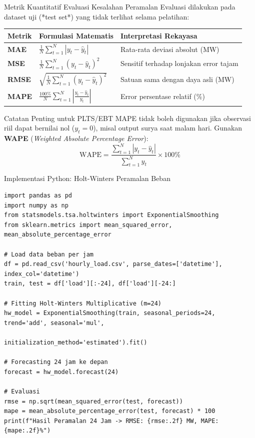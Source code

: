 \documentclass[aspectratio=169, 10pt]{beamer}
\begin{document}
\begin{frame}{Metrik Kuantitatif Evaluasi Kesalahan Peramalan}
    Evaluasi dilakukan pada dataset uji (*test set*) yang tidak terlihat selama pelatihan:
    \begin{table}[h!]
    \centering
    \small
    \renewcommand{\arraystretch}{1.15}
    \begin{tabular}{|l|l|l|}
    \hline
    \rowcolor{lightbg}
    \textbf{Metrik} & \textbf{Formulasi Matematis} & \textbf{Interpretasi Rekayasa} \\ \hline
    \textbf{MAE} & $\frac{1}{N}\sum_{t=1}^N |y_t - \hat{y}_t|$ & Rata-rata deviasi absolut (MW) \\ \hline
    \textbf{MSE} & $\frac{1}{N}\sum_{t=1}^N (y_t - \hat{y}_t)^2$ & Sensitif terhadap lonjakan error tajam \\ \hline
    \textbf{RMSE} & $\sqrt{\frac{1}{N}\sum_{t=1}^N (y_t - \hat{y}_t)^2}$ & Satuan sama dengan daya asli (MW) \\ \hline
    \textbf{MAPE} & $\frac{100\%}{N}\sum_{t=1}^N \left|\frac{y_t - \hat{y}_t}{y_t}\right|$ & Error persentase relatif (\%) \\ \hline
    \end{tabular}
    \end{table}
    \begin{alertblock}{Catatan Penting untuk PLTS/EBT}
        MAPE tidak boleh digunakan jika observasi riil dapat bernilai nol ($y_t = 0$), misal output surya saat malam hari. Gunakan \textbf{WAPE} (\textit{Weighted Absolute Percentage Error}):
        \begin{equation*}
            \text{WAPE} = \frac{\sum_{t=1}^N |y_t - \hat{y}_t|}{\sum_{t=1}^N y_t} \times 100\%
        \end{equation*}
    \end{alertblock}
\end{frame}

\begin{frame}[fragile]{Implementasi Python: Holt-Winters Peramalan Beban}
\begin{lstlisting}
import pandas as pd
import numpy as np
from statsmodels.tsa.holtwinters import ExponentialSmoothing
from sklearn.metrics import mean_squared_error, mean_absolute_percentage_error

# Load data beban per jam
df = pd.read_csv('hourly_load.csv', parse_dates=['datetime'], index_col='datetime')
train, test = df['load'][:-24], df['load'][-24:]

# Fitting Holt-Winters Multiplicative (m=24)
hw_model = ExponentialSmoothing(train, seasonal_periods=24, trend='add', seasonal='mul',
                                initialization_method='estimated').fit()

# Forecasting 24 jam ke depan
forecast = hw_model.forecast(24)

# Evaluasi
rmse = np.sqrt(mean_squared_error(test, forecast))
mape = mean_absolute_percentage_error(test, forecast) * 100
print(f"Hasil Peramalan 24 Jam -> RMSE: {rmse:.2f} MW, MAPE: {mape:.2f}%")
\end{lstlisting}
\end{frame}
\end{document}
